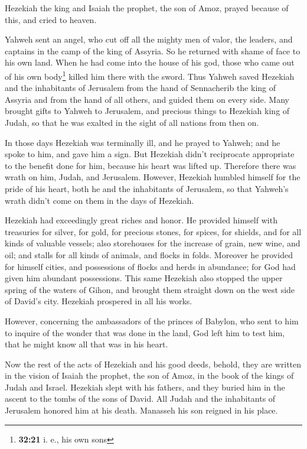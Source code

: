  Hezekiah the king and Isaiah the prophet, the son of
Amoz, prayed because of this, and cried to heaven.

 Yahweh sent an angel, who cut off all the mighty men of
valor, the leaders, and captains in the camp of the king of Assyria. So
he returned with shame of face to his own land. When he had come into
the house of his god, those who came out of his own body\footnote{\textbf{32:21}
  i. e., his own sons} killed him there with the sword. 
Thus Yahweh saved Hezekiah and the inhabitants of Jerusalem from the
hand of Sennacherib the king of Assyria and from the hand of all others,
and guided them on every side.  Many brought gifts to
Yahweh to Jerusalem, and precious things to Hezekiah king of Judah, so
that he was exalted in the sight of all nations from then on.

 In those days Hezekiah was terminally ill, and he prayed
to Yahweh; and he spoke to him, and gave him a sign.  But
Hezekiah didn't reciprocate appropriate to the benefit done for him,
because his heart was lifted up. Therefore there was wrath on him,
Judah, and Jerusalem.  However, Hezekiah humbled himself
for the pride of his heart, both he and the inhabitants of Jerusalem, so
that Yahweh's wrath didn't come on them in the days of Hezekiah.

 Hezekiah had exceedingly great riches and honor. He
provided himself with treasuries for silver, for gold, for precious
stones, for spices, for shields, and for all kinds of valuable vessels;
 also storehouses for the increase of grain, new wine,
and oil; and stalls for all kinds of animals, and flocks in folds.
 Moreover he provided for himself cities, and possessions
of flocks and herds in abundance; for God had given him abundant
possessions.  This same Hezekiah also stopped the upper
spring of the waters of Gihon, and brought them straight down on the
west side of David's city. Hezekiah prospered in all his works.

 However, concerning the ambassadors of the princes of
Babylon, who sent to him to inquire of the wonder that was done in the
land, God left him to test him, that he might know all that was in his
heart.

 Now the rest of the acts of Hezekiah and his good deeds,
behold, they are written in the vision of Isaiah the prophet, the son of
Amoz, in the book of the kings of Judah and Israel. 
Hezekiah slept with his fathers, and they buried him in the ascent to
the tombs of the sons of David. All Judah and the inhabitants of
Jerusalem honored him at his death. Manasseh his son reigned in his
place.

